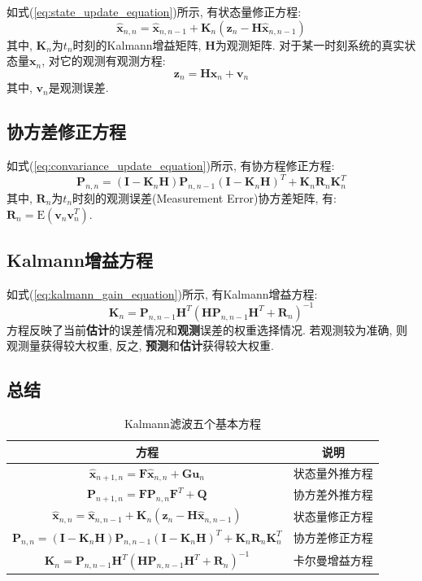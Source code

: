 \documentclass[12pt]{article}
\begin{document}
如式(\ref{eq:state_update_equation})所示, 有状态量修正方程:
\begin{equation*}
\hat{\bm{x}}_{n,n} = \hat{\bm{x}}_{n,n-1}+\bm{K}_n (\bm{z}_n - \bm{H}\hat{\bm{x}}_{n,n-1})
\end{equation*}
其中, $\bm{K}_n$为$t_n$时刻的Kalmann增益矩阵, $\bm{H}$为观测矩阵. 对于某一时刻系统的真实状态量$\bm{x}_n$, 对它的观测有观测方程:
\begin{equation} \label{eq:measurement_equation}
\bm{z}_n = \bm{H}\bm{x}_n + \bm{v}_n
\end{equation}
其中, $\bm{v}_n$是观测误差. 

\subsection{协方差修正方程}

如式(\ref{eq:convariance_update_equation})所示, 有协方程修正方程:
\begin{equation*}
\bm{P}_{n,n} = (\bm{I} - \bm{K}_n \bm{H}) \bm{P}_{n,n-1} (\bm{I} - \bm{K}_n \bm{H})^T + \bm{K}_n \bm{R}_n \bm{K}_n^T
\end{equation*}
其中, $\bm{R}_n$为$t_n$时刻的观测误差(Measurement Error)协方差矩阵, 有: $\bm{R}_n = \mathrm{E}(\bm{v}_n \bm{v}_n^T)$. 

\subsection{Kalmann增益方程}

如式(\ref{eq:kalmann_gain_equation})所示, 有Kalmann增益方程:
\begin{equation*}
\bm{K}_n = \bm{P}_{n,n-1}\bm{H}^T(\bm{H}\bm{P}_{n,n-1}\bm{H}^T + \bm{R}_n)^{-1}
\end{equation*}
方程反映了当前\textbf{估计}的误差情况和\textbf{观测}误差的权重选择情况. 若观测较为准确, 则观测量获得较大权重, 反之, \textbf{预测}和\textbf{估计}获得较大权重.

\subsection{总结}

\begin{table}[H]
\centering
\caption{Kalmann滤波五个基本方程}
\label{tab:basic_equations}
\begin{tabular}{cc} 
\hline 			
方程 & 说明  \\  
\hline 
$\hat{\bm{x}}_{n+1,n} = \bm{F} \hat{\bm{x}}_{n,n} + \bm{G} \bm{u}_n $ & 状态量外推方程 \\ 
$\bm{P}_{n+1,n} = \bm{F}\bm{P}_{n,n}\bm{F}^T + \bm{Q}$ & 协方差外推方程 \\  
$\hat{\bm{x}}_{n,n} = \hat{\bm{x}}_{n,n-1}+\bm{K}_n (\bm{z}_n - \bm{H}\hat{\bm{x}}_{n,n-1})$ & 状态量修正方程 \\
$\bm{P}_{n,n} = (\bm{I} - \bm{K}_n \bm{H}) \bm{P}_{n,n-1} (\bm{I} - \bm{K}_n \bm{H})^T + \bm{K}_n \bm{R}_n \bm{K}_n^T$ & 协方差修正方程 \\
$\bm{K}_n = \bm{P}_{n,n-1}\bm{H}^T(\bm{H}\bm{P}_{n,n-1}\bm{H}^T + \bm{R}_n)^{-1}$ & 卡尔曼增益方程 \\
\hline 
\end{tabular}
\end{table}
\end{document}
